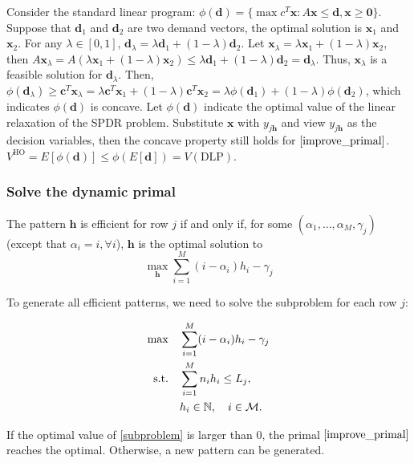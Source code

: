 Consider the standard linear program: $\phi(\bm{d})= \{\max c^{T} \bm{x}: A \bm{x} \leq \bm{d}, \bm{x} \geq \bm{0}\}$.  Suppose that $\bm{d}_1$ and $\bm{d}_2$ are two demand vectors, the optimal solution is $\bm{x}_1$ and $\bm{x}_2$. For any $\lambda \in [0, 1]$, $\bm{d}_{\lambda} = \lambda \bm{d}_{1} + (1- \lambda) \bm{d}_{2}$. Let $\bm{x}_{\lambda} = \lambda \bm{x}_{1} + (1-\lambda) \bm{x}_{2}$, then $A \bm{x}_{\lambda} = A(\lambda \bm{x}_{1} + (1-\lambda) \bm{x}_{2}) \leq \lambda \bm{d}_{1} + (1- \lambda) \bm{d}_{2} = \bm{d}_{\lambda}$. Thus, $\bm{x}_{\lambda}$ is a feasible solution for $\bm{d}_{\lambda}$. Then, $\phi(\bm{d}_{\lambda}) \geq \bm{c}^{T} \bm{x}_{\lambda} = \lambda \bm{c}^{T} \bm{x}_{1} + (1-\lambda) \bm{c}^{T} \bm{x}_{2} = \lambda \phi(\bm{d}_{1}) + (1- \lambda) \phi(\bm{d}_{2})$, which indicates $\phi(\bm{d})$ is concave. Let $\phi(\bm{d})$ indicate the optimal value of the linear relaxation of the SPDR problem. Substitute $\bm{x}$ with $y_{j \bm{h}}$ and view $y_{j \bm{h}}$ as the decision variables, then the concave property still holds for $\eqref{improve_primal}$. $V^{\text{HO}} = E[\phi(\bm{d})] \leq \phi(E[\bm{d}]) = V(\text{DLP})$.

\subsubsection{Solve the dynamic primal}

The pattern $\bm{h}$ is efficient for row $j$ if and only if, for some $(\alpha_{1}, \ldots, \alpha_{M}, \gamma_{j})$ (except that $\alpha_{i} = i, \forall i$), $\bm{h}$ is the optimal solution to $$\max_{\bm{h}} \sum_{i=1}^{M} (i - \alpha_{i}) h_{i} - \gamma_{j}$$

To generate all efficient patterns, we need to solve the subproblem for each row $j$:

\begin{align}\label{subproblem}
    \max \quad & \sum_{i=1}^{M} (i - \alpha_{i}) h_{i} - \gamma_{j} \\
    \text {s.t.} \quad & \sum_{i= 1}^{M} n_{i} h_{i} \leq L_j, \notag \\
    & h_{i} \in \mathbb{N}, \quad i \in \mathcal{M}. \notag
\end{align} 

If the optimal value of \eqref{subproblem} is larger than $0$, the primal $\eqref{improve_primal}$ reaches the optimal. Otherwise, a new pattern can be generated.


